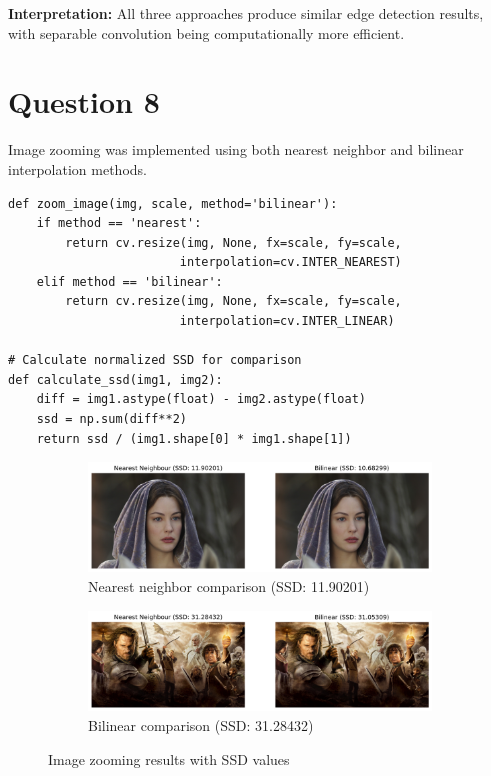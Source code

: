 \documentclass[10pt,a4paper]{article}
\begin{document}
\textbf{Interpretation:} All three approaches produce similar edge detection results, with separable convolution being computationally more efficient.

\section{Question 8}
Image zooming was implemented using both nearest neighbor and bilinear interpolation methods.

\begin{lstlisting}[caption=Image zooming implementation]
def zoom_image(img, scale, method='bilinear'):
    if method == 'nearest':
        return cv.resize(img, None, fx=scale, fy=scale, 
                        interpolation=cv.INTER_NEAREST)
    elif method == 'bilinear':
        return cv.resize(img, None, fx=scale, fy=scale, 
                        interpolation=cv.INTER_LINEAR)

# Calculate normalized SSD for comparison
def calculate_ssd(img1, img2):
    diff = img1.astype(float) - img2.astype(float)
    ssd = np.sum(diff**2)
    return ssd / (img1.shape[0] * img1.shape[1])
\end{lstlisting}

\begin{figure}[H]
    \centering
    \begin{subfigure}{0.48\textwidth}
        \includegraphics[width=\textwidth]{task8/comparison_nearest_ssd_11_90201.png}
        \caption{Nearest neighbor comparison (SSD: 11.90201)}
    \end{subfigure}
    \hfill
    \begin{subfigure}{0.48\textwidth}
        \includegraphics[width=\textwidth]{task8/comparison_nearest_ssd_31_28432.png}
        \caption{Bilinear comparison (SSD: 31.28432)}
    \end{subfigure}
    \caption{Image zooming results with SSD values}
\end{figure}
\end{document}
